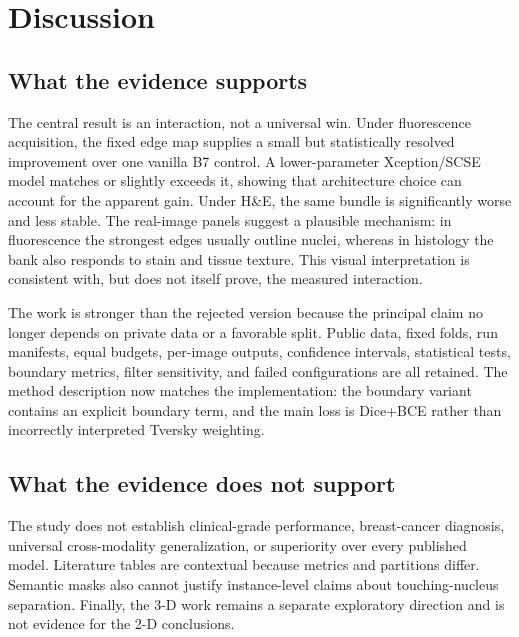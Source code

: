 \documentclass{article}
\begin{document}
\section{Discussion}
\subsection{What the evidence supports}
The central result is an interaction, not a universal win. Under fluorescence acquisition, the fixed edge map supplies a small but statistically resolved improvement over one vanilla B7 control. A lower-parameter Xception/SCSE model matches or slightly exceeds it, showing that architecture choice can account for the apparent gain. Under H\&E, the same bundle is significantly worse and less stable. The real-image panels suggest a plausible mechanism: in fluorescence the strongest edges usually outline nuclei, whereas in histology the bank also responds to stain and tissue texture. This visual interpretation is consistent with, but does not itself prove, the measured interaction.

The work is stronger than the rejected version because the principal claim no longer depends on private data or a favorable split. Public data, fixed folds, run manifests, equal budgets, per-image outputs, confidence intervals, statistical tests, boundary metrics, filter sensitivity, and failed configurations are all retained. The method description now matches the implementation: the boundary variant contains an explicit boundary term, and the main loss is Dice+BCE rather than incorrectly interpreted Tversky weighting.

\subsection{What the evidence does not support}
The study does not establish clinical-grade performance, breast-cancer diagnosis, universal cross-modality generalization, or superiority over every published model. Literature tables are contextual because metrics and partitions differ. Semantic masks also cannot justify instance-level claims about touching-nucleus separation. Finally, the 3-D work remains a separate exploratory direction and is not evidence for the 2-D conclusions.
\end{document}
